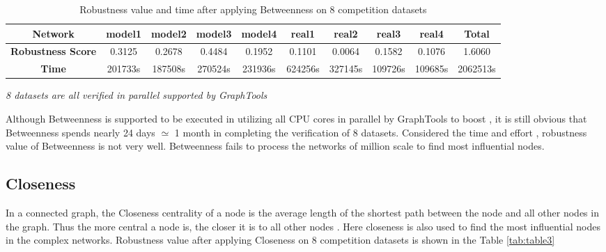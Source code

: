 \documentclass{article}
\begin{document}
	
\begin{table}[!htbp]
	\begin{adjustwidth}{-1.3cm}{}		
		\begin{threeparttable}
			\centering
			\caption{Robustness value and time after applying Betweenness on 8 competition datasets}
			\label{tab:table2}
		
			\begin{tabular}{|c|c|c|c|c|c|c|c|c|c|}
				\hline
				\textbf{Network}          & \textbf{model1} & \textbf{model2} & \textbf{model3} & \textbf{model4} & \textbf{real1} & \textbf{real2} & \textbf{real3} & \textbf{real4} & \textbf{Total} \\ \hline
				\textbf{Robustness Score} & 0.3125          & 0.2678          & 0.4484          & 0.1952          & 0.1101         & 0.0064         & 0.1582         & 0.1076         & 1.6060         \\ \hline
				\textbf{Time}     & 201733s          & 187508s          & 270524s          & 231936s         & 624256s         & 327145s         & 109726s         & 109685s         & 2062513s        \\ \hline
			\end{tabular}
				\begin{tablenotes}
					\small
					\item\textit{8 datasets are all verified in parallel supported by GraphTools \cite{peixotographtool2014}}
				\end{tablenotes}			
	 	\end{threeparttable}
	\end{adjustwidth}
\end{table}
	
	
	Although Betweenness is supported to be executed in utilizing all CPU cores in parallel by GraphTools \cite{peixotographtool2014} to boost , it is still obvious that Betweenness spends nearly 24 days $\simeq$ 1 month in completing the verification of 8 datasets. Considered the time and effort , robustness value of Betweenness is not very well. Betweenness fails to process the networks of million scale to find most influential nodes.
	
	\subsection{Closeness}	
	
	
	In a connected graph, the Closeness centrality of a node is the average length of the shortest path between the node and all other nodes in the graph. Thus the more central a node is, the closer it is to all other nodes \cite{wikiClosenesscentrality}\cite{bavelas1950communication} . Here closeness is also used to find the most influential nodes in the complex networks. Robustness value after applying Closeness on 8 competition datasets is shown in the Table \ref{tab:table3}
	
\end{document}
